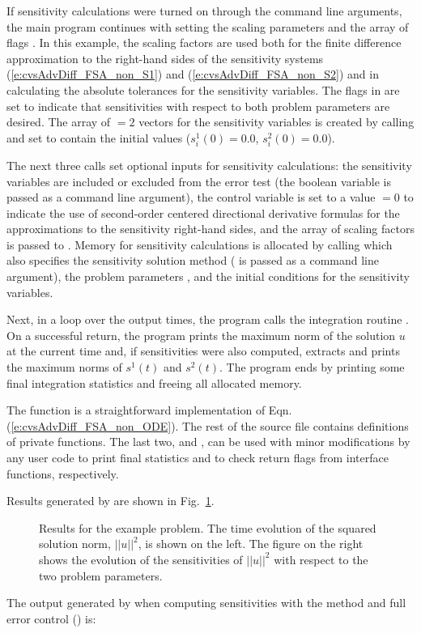 If sensitivity calculations were turned on through the command line arguments,
the main program continues with setting the scaling parameters
 and the array of flags . In this example,
the scaling factors  are used both for the finite difference approximation
to the right-hand sides of the sensitivity systems (\ref{e:cvsAdvDiff_FSA_non_S1}) 
and (\ref{e:cvsAdvDiff_FSA_non_S2}) and in calculating the absolute tolerances for the 
sensitivity variables. 
The flags in  are set to indicate that sensitivities with respect to both 
problem parameters are desired.
The array of  $=2$ vectors  for the sensitivity variables is created
by calling  and set to contain the initial values
($s^1_i(0) = 0.0$, $s^2_i(0) = 0.0$).

The next three calls set optional inputs for sensitivity calculations: the sensitivity
variables are included or excluded from the error test (the boolean variable 
is passed as a command line argument), the control variable  is set to a value
 $=0$ to indicate  the use of second-order centered directional derivative formulas
for the approximations to the sensitivity right-hand sides, and the array of
scaling factors  is passed to {\cvodes}.
Memory for sensitivity calculations is allocated by calling 
which also specifies the sensitivity solution method ( is passed
as a command line argument), the problem parameters , and the initial conditions
for the sensitivity variables.

Next, in a loop over the  output times, the program calls the integration
routine . On a successful return, the program prints the maximum norm
of the solution $u$ at the current time and, if sensitivities were also computed, 
extracts and prints the maximum norms of $s^1(t)$ and $s^2(t)$.
The program ends by printing some final integration statistics and freeing all
allocated memory.

The  function is a straightforward implementation of Eqn.
(\ref{e:cvsAdvDiff_FSA_non_ODE}).  The rest of the source file
 contains definitions of private functions.  The last
two,  and , can be used with minor
modifications by any {\cvodes} user code to print final {\cvodes}
statistics and to check return flags from {\cvodes} interface
functions, respectively.

Results generated by  are shown in Fig.~\ref{f:cvsAdvDiff_FSA_non}. 
\begin{figure}
  {\centerline{}}
  \caption{Results for the  example problem.
    The time evolution of the squared solution norm, $||u||^2$, is shown on the left. 
    The figure on the right shows the evolution of the sensitivities of $||u||^2$
    with respect to the two problem parameters.}
  \label{f:cvsAdvDiff_FSA_non}
\end{figure}
The output generated by  when computing sensitivities with the 
method and full error control () is:

